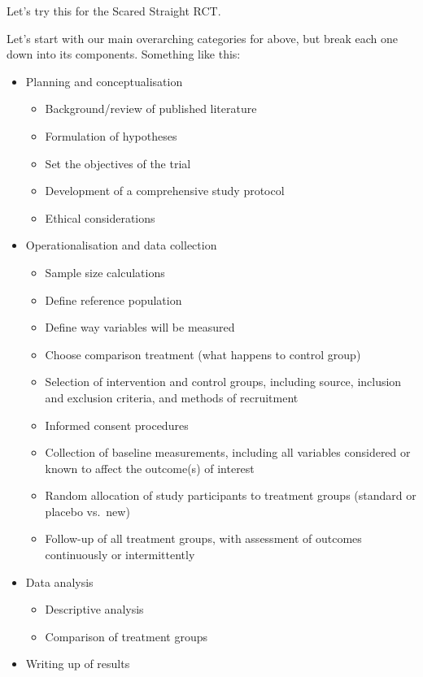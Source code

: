 \documentclass[
]{book}
\providecommand{\tightlist}{%
  \setlength{\itemsep}{0pt}\setlength{\parskip}{0pt}}
\begin{document}
Let's try this for the Scared Straight RCT.

Let's start with our main overarching categories for above, but break each one down into its components. Something like this:

\begin{itemize}
\tightlist
\item
  Planning and conceptualisation

  \begin{itemize}
  \tightlist
  \item
    Background/review of published literature
  \item
    Formulation of hypotheses
  \item
    Set the objectives of the trial
  \item
    Development of a comprehensive study protocol
  \item
    Ethical considerations
  \end{itemize}
\item
  Operationalisation and data collection

  \begin{itemize}
  \tightlist
  \item
    Sample size calculations
  \item
    Define reference population
  \item
    Define way variables will be measured
  \item
    Choose comparison treatment (what happens to control group)
  \item
    Selection of intervention and control groups, including source, inclusion and exclusion criteria, and methods of recruitment
  \item
    Informed consent procedures
  \item
    Collection of baseline measurements, including all variables considered or known to affect the outcome(s) of interest
  \item
    Random allocation of study participants to treatment groups (standard or placebo vs.~new)
  \item
    Follow-up of all treatment groups, with assessment of outcomes continuously or intermittently
  \end{itemize}
\item
  Data analysis

  \begin{itemize}
  \tightlist
  \item
    Descriptive analysis
  \item
    Comparison of treatment groups
  \end{itemize}
\item
  Writing up of results


\end{itemize}
\end{document}
